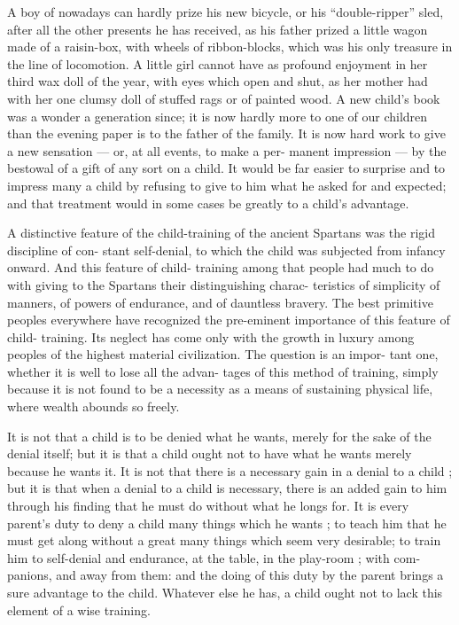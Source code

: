 \documentclass[
]{book}
\begin{document}
A boy of nowadays can hardly prize his new bicycle, or his ``double-ripper'' sled, after all the other presents he has received, as his father prized a little wagon made of a raisin-box, with wheels of ribbon-blocks, which was his only treasure in the line of locomotion. A little girl cannot have as profound enjoyment in her third wax doll of the year, with eyes which open and shut, as her mother had with her one clumsy doll of stuffed rags or of painted wood. A new child's book was a wonder a generation since; it is now hardly more to one of our children than the evening paper is to the father of the family. It is now hard work to give a new sensation --- or, at all events, to make a per- manent impression --- by the bestowal of a gift of any sort on a child. It would be far easier to surprise and to impress many a child by refusing to give to him what he asked for and expected; and that treatment would in some cases be greatly to a child's advantage.

A distinctive feature of the child-training of the ancient Spartans was the rigid discipline of con- stant self-denial, to which the child was subjected from infancy onward. And this feature of child- training among that people had much to do with giving to the Spartans their distinguishing charac- teristics of simplicity of manners, of powers of endurance, and of dauntless bravery. The best primitive peoples everywhere have recognized the pre-eminent importance of this feature of child- training. Its neglect has come only with the growth in luxury among peoples of the highest material civilization. The question is an impor- tant one, whether it is well to lose all the advan- tages of this method of training, simply because it is not found to be a necessity as a means of sustaining physical life, where wealth abounds so freely.

It is not that a child is to be denied what he wants, merely for the sake of the denial itself; but it is that a child ought not to have what he wants merely because he wants it. It is not that there is a necessary gain in a denial to a child ; but it is that when a denial to a child is necessary, there is an added gain to him through his finding that he must do without what he longs for. It is every parent's duty to deny a child many things which he wants ; to teach him that he must get along without a great many things which seem very desirable; to train him to self-denial and endurance, at the table, in the play-room ; with com- panions, and away from them: and the doing of this duty by the parent brings a sure advantage to the child. Whatever else he has, a child ought not to lack this element of a wise training.
\end{document}
